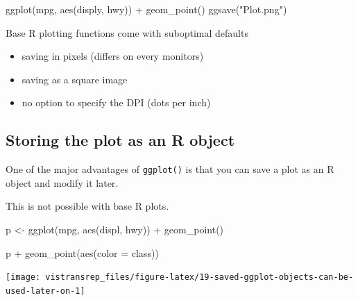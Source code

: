 \documentclass[]{book}
\newenvironment{Shaded}{}{}
\newcommand{\DataTypeTok}[1]{#1}
\newcommand{\KeywordTok}[1]{\textcolor[rgb]{0.00,0.00,1.00}{#1}}
\newcommand{\NormalTok}[1]{#1}
\newcommand{\OperatorTok}[1]{#1}
\newcommand{\StringTok}[1]{\textcolor[rgb]{0.00,0.50,0.50}{#1}}
\begin{document}
\begin{Shaded}
\begin{Highlighting}[]
\KeywordTok{ggplot}\NormalTok{(mpg, }\KeywordTok{aes}\NormalTok{(disply, hwy)) }\OperatorTok{+}
\StringTok{  }\KeywordTok{geom_point}\NormalTok{()}
\KeywordTok{ggsave}\NormalTok{(}\StringTok{"Plot.png"}\NormalTok{)}
\end{Highlighting}
\end{Shaded}

Base R plotting functions come with suboptimal defaults

\begin{itemize}
\item
  saving in pixels (differs on every monitors)
\item
  saving as a square image
\item
  no option to specify the DPI (dots per inch)
\end{itemize}

\hypertarget{storing-the-plot-as-an-r-object}{%
\subsection{Storing the plot as an R object}\label{storing-the-plot-as-an-r-object}}

One of the major advantages of \texttt{ggplot()} is that you can save a plot as an R object and modify it later.

This is not possible with base R plots.

\begin{Shaded}
\begin{Highlighting}[]
\NormalTok{p <-}\StringTok{ }\KeywordTok{ggplot}\NormalTok{(mpg, }\KeywordTok{aes}\NormalTok{(displ, hwy)) }\OperatorTok{+}
\StringTok{  }\KeywordTok{geom_point}\NormalTok{()}
\end{Highlighting}
\end{Shaded}

\begin{Shaded}
\begin{Highlighting}[]
\NormalTok{p }\OperatorTok{+}\StringTok{ }\KeywordTok{geom_point}\NormalTok{(}\KeywordTok{aes}\NormalTok{(}\DataTypeTok{color =}\NormalTok{ class))}
\end{Highlighting}
\end{Shaded}

\begin{flushright}\texttt{[image: vistransrep\_files/figure-latex/19-saved-ggplot-objects-can-be-used-later-on-1]} \end{flushright}
\end{document}
